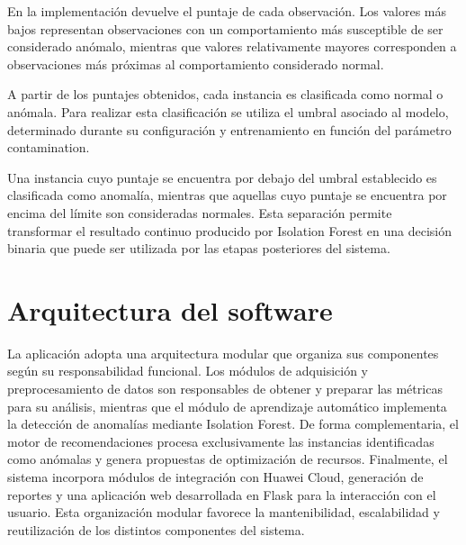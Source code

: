 En la implementación devuelve el puntaje de cada observación. Los
valores más bajos representan observaciones con un comportamiento más
susceptible de ser considerado anómalo, mientras que valores
relativamente mayores corresponden a observaciones más próximas al
comportamiento considerado normal.

A partir de los puntajes obtenidos, cada instancia es clasificada como
normal o anómala. Para realizar esta clasificación se utiliza el umbral
asociado al modelo, determinado durante su configuración y entrenamiento
en función del parámetro contamination.

Una instancia cuyo puntaje se encuentra por debajo del umbral
establecido es clasificada como anomalía, mientras que aquellas cuyo
puntaje se encuentra por encima del límite son consideradas normales.
Esta separación permite transformar el resultado continuo producido por
Isolation Forest en una decisión binaria que puede ser utilizada por las
etapas posteriores del sistema.

\section{Arquitectura del software}

La aplicación adopta una arquitectura modular que organiza sus
componentes según su responsabilidad funcional. Los módulos de
adquisición y preprocesamiento de datos son responsables de obtener y
preparar las métricas para su análisis, mientras que el módulo de
aprendizaje automático implementa la detección de anomalías mediante
Isolation Forest. De forma complementaria, el motor de recomendaciones
procesa exclusivamente las instancias identificadas como anómalas y
genera propuestas de optimización de recursos. Finalmente, el sistema
incorpora módulos de integración con Huawei Cloud, generación de
reportes y una aplicación web desarrollada en Flask para la interacción
con el usuario. Esta organización modular favorece la mantenibilidad,
escalabilidad y reutilización de los distintos componentes del sistema.
